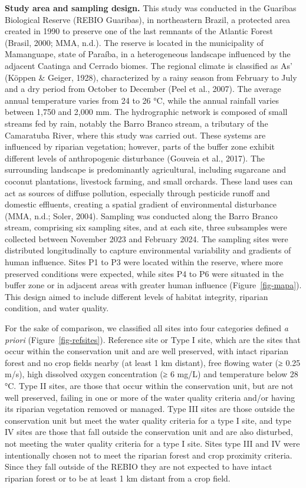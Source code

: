 \documentclass[
  american,
  letterpaper,
  DIV=11,
  numbers=noendperiod]{scrartcl}
\begin{document}
\textbf{Study area and sampling design.} This study was conducted in the
Guaribas Biological Reserve (REBIO Guaribas), in northeastern Brazil, a
protected area created in 1990 to preserve one of the last remnants of
the Atlantic Forest (Brasil, 2000; MMA, n.d.). The reserve is located in
the municipality of Mamanguape, state of Paraíba, in a heterogeneous
landscape influenced by the adjacent Caatinga and Cerrado biomes. The
regional climate is classified as As' (Köppen \& Geiger, 1928),
characterized by a rainy season from February to July and a dry period
from October to December (Peel et al., 2007). The average annual
temperature varies from 24 to 26 °C, while the annual rainfall varies
between 1,750 and 2,000 mm. The hydrographic network is composed of
small streams fed by rain, notably the Barro Branco stream, a tributary
of the Camaratuba River, where this study was carried out. These systems
are influenced by riparian vegetation; however, parts of the buffer zone
exhibit different levels of anthropogenic disturbance (Gouveia et al.,
2017). The surrounding landscape is predominantly agricultural,
including sugarcane and coconut plantations, livestock farming, and
small orchards. These land uses can act as sources of diffuse pollution,
especially through pesticide runoff and domestic effluents, creating a
spatial gradient of environmental disturbance (MMA, n.d.; Soler, 2004).
Sampling was conducted along the Barro Branco stream, comprising six
sampling sites, and at each site, three subsamples were collected
between November 2023 and February 2024. The sampling sites were
distributed longitudinally to capture environmental variability and
gradients of human influence. Sites P1 to P3 were located within the
reserve, where more preserved conditions were expected, while sites P4
to P6 were situated in the buffer zone or in adjacent areas with greater
human influence (Figure~\ref{fig-mapa}). This design aimed to include
different levels of habitat integrity, riparian condition, and water
quality.

For the sake of comparison, we classified all sites into four categories
defined \emph{a priori} (Figure~\ref{fig-refsites}). Reference site or
Type I site, which are the sites that occur within the conservation unit
and are well preserved, with intact riparian forest and no crop fields
nearby (at least 1 km distant), free flowing water (≥ 0.25 m/s), high
dissolved oxygen concentration (≥ 6 mg/L) and temperature below 28 °C.
Type II sites, are those that occur within the conservation unit, but
are not well preserved, failing in one or more of the water quality
criteria and/or having its riparian vegetation removed or managed. Type
III sites are those outside the conservation unit but meet the water
quality criteria for a type I site, and type IV sites are those that
fall outside the conservation unit and are also disturbed, not meeting
the water quality criteria for a type I site. Sites type III and IV were
intentionally chosen not to meet the riparian forest and crop proximity
criteria. Since they fall outside of the REBIO they are not expected to
have intact riparian forest or to be at least 1 km distant from a crop
field.
\end{document}
